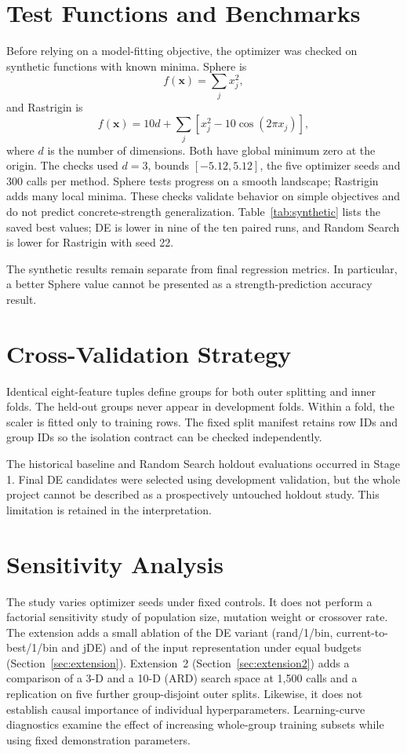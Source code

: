 \section{Test Functions and Benchmarks}
Before relying on a model-fitting objective, the optimizer was checked on synthetic functions with known minima. Sphere is
\begin{equation}f(\mathbf{x})=\sum_j x_j^2,\end{equation}
and Rastrigin is
\begin{equation}f(\mathbf{x})=10d+\sum_j\left[x_j^2-10\cos(2\pi x_j)\right],\end{equation}
where $d$ is the number of dimensions. Both have global minimum zero at the origin. The checks used $d=3$, bounds $[-5.12,5.12]$, the five optimizer seeds and 300 calls per method. Sphere tests progress on a smooth landscape; Rastrigin adds many local minima. These checks validate behavior on simple objectives and do not predict concrete-strength generalization. Table~\ref{tab:synthetic} lists the saved best values; DE is lower in nine of the ten paired runs, and Random Search is lower for Rastrigin with seed 22.

The synthetic results remain separate from final regression metrics. In particular, a better Sphere value cannot be presented as a strength-prediction accuracy result.
\section{Cross-Validation Strategy}
Identical eight-feature tuples define groups for both outer splitting and inner folds. The held-out groups never appear in development folds. Within a fold, the scaler is fitted only to training rows. The fixed split manifest retains row IDs and group IDs so the isolation contract can be checked independently.

The historical baseline and Random Search holdout evaluations occurred in Stage 1. Final DE candidates were selected using development validation, but the whole project cannot be described as a prospectively untouched holdout study. This limitation is retained in the interpretation.
\section{Sensitivity Analysis}
The study varies optimizer seeds under fixed controls. It does not perform a factorial sensitivity study of population size, mutation weight or crossover rate. The extension adds a small ablation of the DE variant (rand/1/bin, current-to-best/1/bin and jDE) and of the input representation under equal budgets (Section~\ref{sec:extension}). Extension~2 (Section~\ref{sec:extension2}) adds a comparison of a 3-D and a 10-D (ARD) search space at 1{,}500 calls and a replication on five further group-disjoint outer splits. Likewise, it does not establish causal importance of individual hyperparameters. Learning-curve diagnostics examine the effect of increasing whole-group training subsets while using fixed demonstration parameters.
